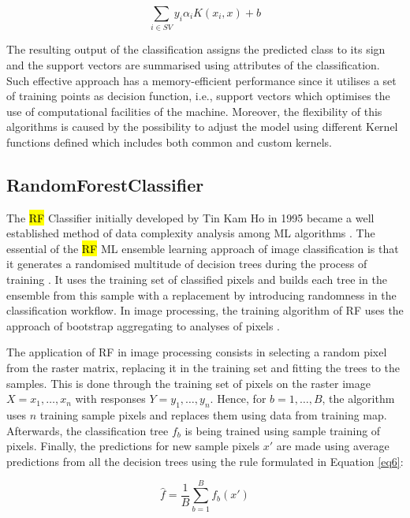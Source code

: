 \documentclass[final,5p,times,twocolumn]{elsarticle}
\numberwithin{table}{section}
\begin{document}
\begin{equation}
\sum_{i\in SV}y_{i}\alpha_{i}K(x_{i},x) + b
\label{eq5}
\end{equation}

The resulting output of the classification assigns the predicted class to its sign and the support vectors are summarised using attributes of the classification. Such effective approach has a memory-efficient performance since it utilises a set of training points as decision function, i.e., support vectors which optimises the use of computational facilities of the machine. Moreover, the flexibility of this algorithms is caused by the possibility to adjust the model using different Kernel functions defined which includes both common and custom kernels. 
 
\subsection{RandomForestClassifier}

The \hl{RF} Classifier initially developed by Tin Kam Ho in 1995 \cite{598994} became a well established method of data complexity analysis among ML algorithms \cite{990132}. The essential of the \hl{RF} ML ensemble learning approach of image classification is that it generates a randomised multitude of decision trees during the process of training \cite{8935521}. It uses the training set of classified pixels and builds each tree in the ensemble from this sample with a replacement by introducing randomness in the classification workflow. In image processing, the training algorithm of RF uses the approach of bootstrap aggregating to analyses of pixels \cite{Bai,coasts4010008,BESSINGER2022928}. 

The application of RF in image processing consists in selecting a random pixel from the raster matrix, replacing it in the training set and fitting the trees to the samples. This is done through the training set of pixels on the raster image $X = x_{1},\dots, x_{n}$ with responses $Y = y_{1}, \dots, y_{n}$. Hence, for $b = 1, \dots, B$, the algorithm uses $n$ training sample pixels and replaces them using data from training map. Afterwards, the classification tree $f_b$ is being trained using sample training of pixels. Finally, the predictions for new sample pixels $x'$ are made using average predictions from all the decision trees using the rule formulated in Equation \ref{eq6}: 

\begin{equation}
\hat f=\frac{1}{B}\sum_{b=1}^{B}f_{b}(x')
\label{eq6}
\end{equation}
\end{document}
